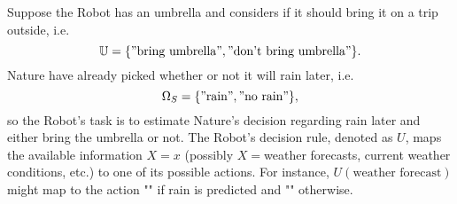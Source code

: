 \begin{example}
	\label{ex:rain}
	Suppose the Robot has an umbrella and considers if it should bring it on a trip outside, i.e.
	\begin{equation}
		\mathbb{U} = \{"\text{bring umbrella}", "\text{don't bring umbrella}"\}.
	\end{equation}
	Nature have already picked whether or not it will rain later, i.e.
	\begin{equation}
		\Omega_S = \{"\text{rain}", "\text{no rain}"\},
	\end{equation}
	so the Robot's task is to estimate Nature's decision regarding rain later and either bring the umbrella or not. The Robot's decision rule, denoted as $U$, maps the available information $X=x$ (possibly $X=$weather forecasts, current weather conditions, etc.) to one of its possible actions. For instance, $U(\text{weather forecast})$ might map to the action "" if rain is predicted and "" otherwise.
\end{example}

